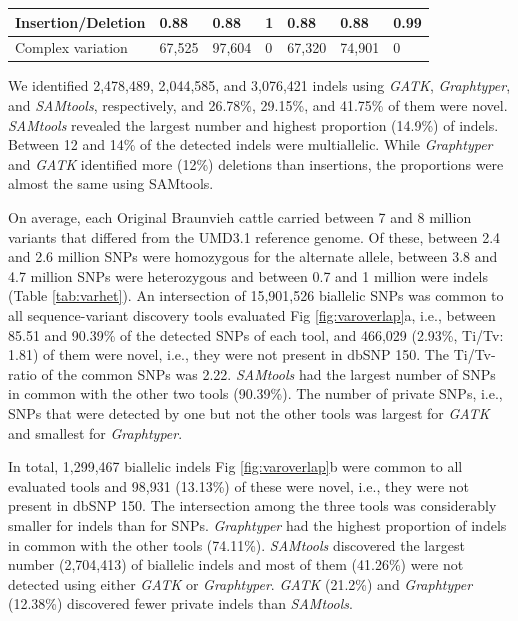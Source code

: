 \documentclass[../main.tex]{subfiles}
\begin{document}
\begin{landscape}
\begin{table}
\begin{tabular}{|l|l|l|l|l|l|l|}
    \hline
    Insertion/Deletion    & 0.88                  & 0.88                        & 1                         & 0.88                  & 0.88                        & 0.99                       \\ 
    \hline
    Complex variation     & 67,525                & 97,604                      & 0                         & 67,320                & 74,901                      & 0                          \\
    \hline
    \end{tabular}
    \label{tab:varcount}
    \end{table}
\end{landscape}

\newpage

We identified 2,478,489, 2,044,585, and 3,076,421 indels using \emph{GATK}, \emph{Graphtyper}, and \emph{SAMtools}, respectively, and 26.78\%, 29.15\%, and 41.75\% of them were novel. 
\emph{SAMtools} revealed the largest number and highest proportion (14.9\%) of indels. 
Between 12 and 14\% of the detected indels were multiallelic. 
While \emph{Graphtyper} and \emph{GATK} identified more (12\%) deletions than insertions, the proportions were almost the same using SAMtools.

On average, each Original Braunvieh cattle carried between 7 and 8 million variants that differed from the UMD3.1 reference genome. 
Of these, between 2.4 and 2.6 million SNPs were homozygous for the alternate allele, between 3.8 and 4.7 million SNPs were heterozygous and between 0.7 and 1 million were indels (Table \ref{tab:varhet}). An intersection of 15,901,526 biallelic SNPs was common to all sequence-variant discovery tools evaluated Fig \ref{fig:varoverlap}a, i.e., between 85.51 and 90.39\% of the detected SNPs of each tool, and 466,029 (2.93\%, Ti/Tv: 1.81) of them were novel, i.e., they were not present in dbSNP 150. 
The Ti/Tv-ratio of the common SNPs was 2.22. 
\emph{SAMtools} had the largest number of SNPs in common with the other two tools (90.39\%). The number of private SNPs, i.e., SNPs that were detected by one but not the other tools was largest for \emph{GATK} and smallest for \emph{Graphtyper}.

In total, 1,299,467 biallelic indels Fig \ref{fig:varoverlap}b were common to all evaluated tools and 98,931 (13.13\%) of these were novel, 
i.e., they were not present in dbSNP 150. The intersection among the three tools was considerably smaller for indels than for SNPs. 
\emph{Graphtyper} had the highest proportion of indels in common with the other tools (74.11\%). 
\emph{SAMtools} discovered the largest number (2,704,413) of biallelic indels and most of them (41.26\%) were not detected using either \emph{GATK} or \emph{Graphtyper}. 
\emph{GATK} (21.2\%) and \emph{Graphtyper} (12.38\%) discovered fewer private indels than \emph{SAMtools}.
\end{document}
